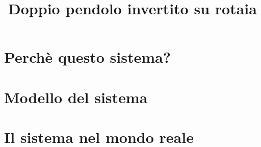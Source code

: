 \title{Doppio pendolo invertito su rotaia}
\maketitle
\label{sec:dpic}



\section{Perchè questo sistema?}

\section{Modello del sistema}

\section{Il sistema nel mondo reale}

